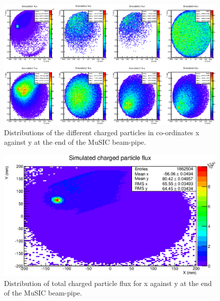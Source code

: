 \begin{figure}
  \centering
    \includegraphics[width=.9\textwidth]{images/sim_2d_per_pid_flux.eps}
  \caption{Distributions of the different charged particles in co-ordinates x against y at the end of the MuSIC beam-pipe.}
  \label{fig:images_sim_2d_per_pid_flux}
\end{figure}

\begin{figure}[hptb]
  \centering
  \includegraphics[width=.9\textwidth]{images/sim_2d_charged_particle_flux.eps}
  \caption{Distribution of total charged particle flux for x against y at the end of the MuSIC beam-pipe.}
  \label{fig:images_sim_2d_charged_particle_flux}
\end{figure}

